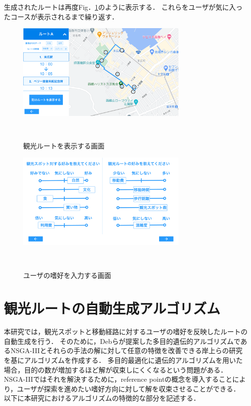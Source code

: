生成されたルートは再度Fig．\ref{fig:観光ルートを表示する画面}のように表示する．
これらをユーザが気に入ったコースが表示されるまで繰り返す．
\begin{figure}[h]
  \begin{center}
  \includegraphics[width=8.5cm,bb=0 0 1980 1080]{sysimage1.png}
  \end{center}
  \caption{観光ルートを表示する画面}　
  \label{fig:観光ルートを表示する画面}
\end{figure}

\begin{figure}[h]
  \begin{center}
  \includegraphics[width=8.5cm,bb=0 0 1980 1080]{sysimage2.png}
  \end{center}
  \caption{ユーザの嗜好を入力する画面}　
  \label{fig:ユーザの嗜好を入力する画面}
\end{figure}
\section{観光ルートの自動生成アルゴリズム}\label{sec:観光ルート自動生成アルゴリズム}
本研究では，観光スポットと移動経路に対するユーザの嗜好を反映したルートの自動生成を行う．
そのために，Debらが提案した多目的遺伝的アルゴリズムであるNSGA-I\hspace{-.1em}I\hspace{-.1em}I\cite{NSGA3}とそれらの手法の解に対して任意の特徴を改善できる岸上らの研究\cite{岸上}を基にアルゴリズムを作成する．
多目的最適化に遺伝的アルゴリズムを用いた場合，目的の数が増加するほど解が収束しにくくなるという問題がある．
NSGA-I\hspace{-.1em}I\hspace{-.1em}Iではそれを解決するために，reference pointの概念を導入することにより，ユーザが探索を進めたい嗜好方向に対して解を収束させることができる．
以下に本研究におけるアルゴリズムの特徴的な部分を記述する．
